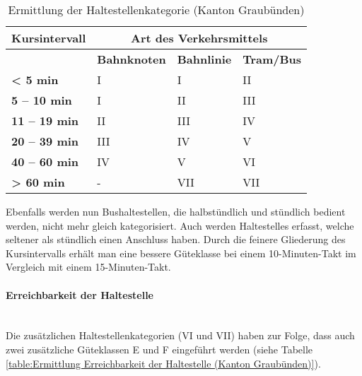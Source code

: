 \begin{table}[ht]
    \begin{tabular}[c]{l p{4.0cm} p{4.0cm} p{4.0cm}}
        \toprule
        \textbf{Kursintervall}
                                & \multicolumn{3}{c}{\textbf{Art des Verkehrsmittels}}\\
        \midrule
        \textbf{}
                                & \textbf{Bahnknoten}
                                & \textbf{Bahnlinie}
                                & \textbf{Tram/Bus}\\
        \textbf{< 5 min}
                                & I
                                & I
                                & II\\
        \cellcolor{red!25}\textbf{5 -- 10 min}
                                & I
                                & II
                                & III\\
        \cellcolor{red!25}\textbf{11 -- 19 min}
                                & II
                                & III
                                & IV\\
        \textbf{20 -- 39 min}
                                & III
                                & IV
                                & V\\
        \textbf{40 -- 60 min}
                                & IV
                                & V
                                & \cellcolor{red!25}VI\\
        \cellcolor{red!25}\textbf{> 60 min}
                                & -
                                & \cellcolor{red!25}VII
                                & \cellcolor{red!25}VII\\
        \bottomrule
    \end{tabular}
    \caption{Ermittlung der Haltestellenkategorie (Kanton Graubünden)}
    \label{table:Ermittlung der Haltestellenkategorie (Kanton Graubünden)}
\end{table}

Ebenfalls werden nun Bushaltestellen, die halbstündlich und stündlich bedient werden, nicht mehr gleich kategorisiert.
Auch werden \glspl{Haltestelle} erfasst, welche seltener als stündlich einen Anschluss haben.
Durch die feinere Gliederung des Kursintervalls erhält man eine bessere Güteklasse bei einem 10-Minuten-Takt im Vergleich mit einem 15-Minuten-Takt.

\paragraph{Erreichbarkeit der Haltestelle}~\\
\label{Berechnungsmethodik Kanton Graubünden:Erreichbarkeit der Haltestelle}
Die zusätzlichen Haltestellenkategorien (VI und VII) haben zur Folge, dass auch zwei zusätzliche Güteklassen E und F eingeführt werden (siehe Tabelle \ref{table:Ermittlung Erreichbarkeit der Haltestelle (Kanton Graubünden)}).

